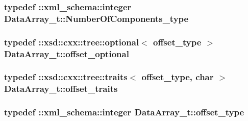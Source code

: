 \subsubsection[{\texorpdfstring{Number\+Of\+Components\+\_\+type}{NumberOfComponents_type}}]{\setlength{\rightskip}{0pt plus 5cm}typedef \+::{\bf xml\+\_\+schema\+::integer} {\bf Data\+Array\+\_\+t\+::\+Number\+Of\+Components\+\_\+type}}\hypertarget{classDataArray__t_aac602cec132f6e771f7fa3be1d19c16f}{}\label{classDataArray__t_aac602cec132f6e771f7fa3be1d19c16f}
\subsubsection[{\texorpdfstring{offset\+\_\+optional}{offset_optional}}]{\setlength{\rightskip}{0pt plus 5cm}typedef \+::xsd\+::cxx\+::tree\+::optional$<$ {\bf offset\+\_\+type} $>$ {\bf Data\+Array\+\_\+t\+::offset\+\_\+optional}}\hypertarget{classDataArray__t_a4bc33060e7c386b658c752347ac5f03e}{}\label{classDataArray__t_a4bc33060e7c386b658c752347ac5f03e}
\subsubsection[{\texorpdfstring{offset\+\_\+traits}{offset_traits}}]{\setlength{\rightskip}{0pt plus 5cm}typedef \+::xsd\+::cxx\+::tree\+::traits$<$ {\bf offset\+\_\+type}, char $>$ {\bf Data\+Array\+\_\+t\+::offset\+\_\+traits}}\hypertarget{classDataArray__t_a2e3e1a5de665fc64a3d86fd94bb1af0f}{}\label{classDataArray__t_a2e3e1a5de665fc64a3d86fd94bb1af0f}
\subsubsection[{\texorpdfstring{offset\+\_\+type}{offset_type}}]{\setlength{\rightskip}{0pt plus 5cm}typedef \+::{\bf xml\+\_\+schema\+::integer} {\bf Data\+Array\+\_\+t\+::offset\+\_\+type}}\hypertarget{classDataArray__t_a7b840c5f08bd2c65cd3c5e24ad132cfb}{}\label{classDataArray__t_a7b840c5f08bd2c65cd3c5e24ad132cfb}
